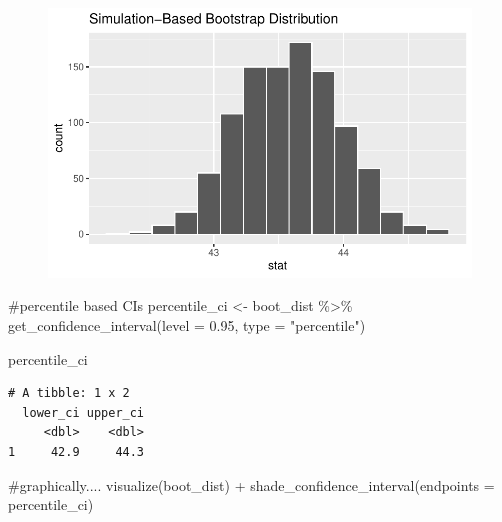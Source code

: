 \documentclass[
  letterpaper,
  DIV=11,
  numbers=noendperiod]{scrartcl}
\newenvironment{Shaded}{\begin{snugshade}}{\end{snugshade}}
\newcommand{\AttributeTok}[1]{\textcolor[rgb]{0.40,0.45,0.13}{#1}}
\newcommand{\CommentTok}[1]{\textcolor[rgb]{0.37,0.37,0.37}{#1}}
\newcommand{\FloatTok}[1]{\textcolor[rgb]{0.68,0.00,0.00}{#1}}
\newcommand{\FunctionTok}[1]{\textcolor[rgb]{0.28,0.35,0.67}{#1}}
\newcommand{\NormalTok}[1]{\textcolor[rgb]{0.00,0.23,0.31}{#1}}
\newcommand{\OtherTok}[1]{\textcolor[rgb]{0.00,0.23,0.31}{#1}}
\newcommand{\SpecialCharTok}[1]{\textcolor[rgb]{0.37,0.37,0.37}{#1}}
\newcommand{\StringTok}[1]{\textcolor[rgb]{0.13,0.47,0.30}{#1}}
\begin{document}
\begin{figure}[H]

{\centering \includegraphics{CIs_files/figure-pdf/unnamed-chunk-9-1.pdf}

}

\end{figure}

\begin{Shaded}
\begin{Highlighting}[]
\CommentTok{\#percentile based CIs}
\NormalTok{percentile\_ci }\OtherTok{\textless{}{-}}\NormalTok{ boot\_dist }\SpecialCharTok{\%\textgreater{}\%} 
  \FunctionTok{get\_confidence\_interval}\NormalTok{(}\AttributeTok{level =} \FloatTok{0.95}\NormalTok{, }\AttributeTok{type =} \StringTok{"percentile"}\NormalTok{)}

\NormalTok{percentile\_ci}
\end{Highlighting}
\end{Shaded}

\begin{verbatim}
# A tibble: 1 x 2
  lower_ci upper_ci
     <dbl>    <dbl>
1     42.9     44.3
\end{verbatim}

\begin{Shaded}
\begin{Highlighting}[]
\CommentTok{\#graphically....}
\FunctionTok{visualize}\NormalTok{(boot\_dist) }\SpecialCharTok{+} 
  \FunctionTok{shade\_confidence\_interval}\NormalTok{(}\AttributeTok{endpoints =}\NormalTok{ percentile\_ci)}
\end{Highlighting}
\end{Shaded}
\end{document}
